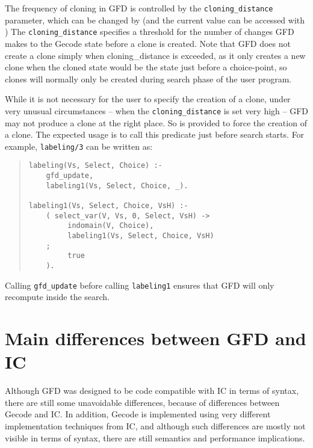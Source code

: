 The frequency of cloning in GFD is controlled by the
\texttt{cloning_distance} parameter, which can be changed by
(and the current value can be accessed with
)
The \texttt{cloning_distance} specifies a threshold for the number of
changes GFD makes to the Gecode state before a clone is created.
Note that GFD does not create a clone simply when cloning_distance is
exceeded, as it only creates a new clone when the cloned state would
be the state just before a choice-point, so clones will normally only
be created during search phase of the user program.

While it is not necessary for the user to specify the creation of a clone,
under very unusual circumstances -- when the \texttt{cloning_distance} is
set very high -- GFD may not produce a clone at the right place. So
 is provided to force the creation of a clone.
The expected usage is to call this predicate just before search starts.
For example, \texttt{labeling/3} can be written as:

\begin{quote}
\begin{verbatim}
labeling(Vs, Select, Choice) :-
    gfd_update,
    labeling1(Vs, Select, Choice, _).

labeling1(Vs, Select, Choice, VsH) :-
    ( select_var(V, Vs, 0, Select, VsH) ->
         indomain(V, Choice),
         labeling1(Vs, Select, Choice, VsH)
    ;
         true
    ).

\end{verbatim}
\end{quote}
Calling \texttt{gfd_update} before calling \texttt{labeling1} ensures that
GFD will only recompute inside the search.

\section{Main differences between GFD and IC}

Although GFD was designed to be code compatible with IC in terms of
syntax, there are still some unavoidable differences, because of differences 
between Gecode and IC. In addition, Gecode is 
implemented using very different implementation techniques from IC, and 
although such differences are mostly not visible in terms of syntax, there
are still semantics and performance implications. 

